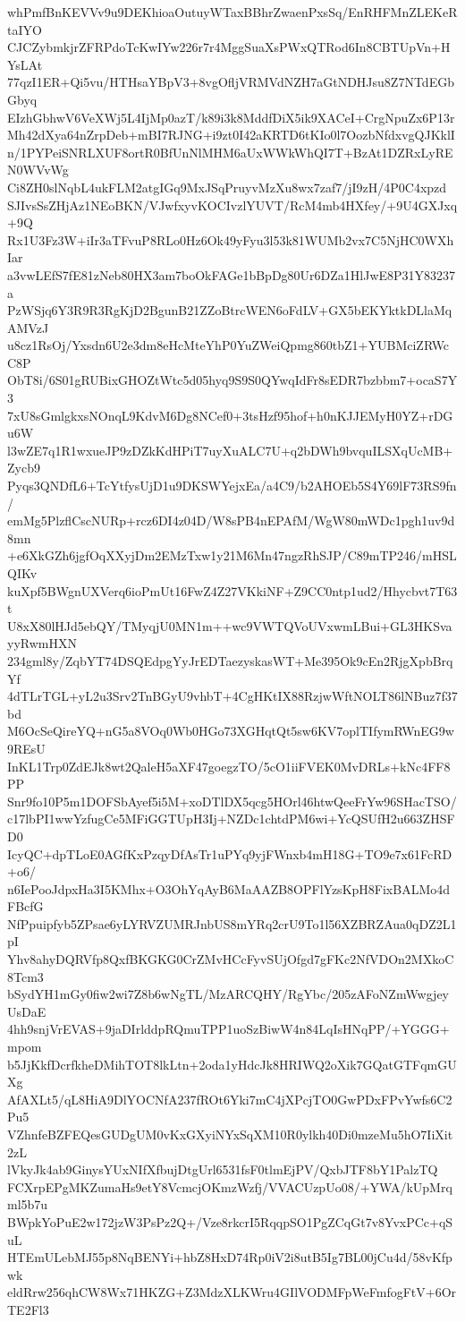 whPmfBnKEVVv9u9DEKhioaOutuyWTaxBBhrZwaenPxsSq/EnRHFMnZLEKeRtaIYO
CJCZybmkjrZFRPdoTcKwIYw226r7r4MggSuaXsPWxQTRod6In8CBTUpVn+HYsLAt
77qzI1ER+Qi5vu/HTHsaYBpV3+8vgOfljVRMVdNZH7aGtNDHJsu8Z7NTdEGbGbyq
EIzhGbhwV6VeXWj5L4IjMp0azT/k89i3k8MddfDiX5ik9XACeI+CrgNpuZx6P13r
Mh42dXya64nZrpDeb+mBI7RJNG+i9zt0I42aKRTD6tKIo0l7OozbNfdxvgQJKklI
n/1PYPeiSNRLXUF8ortR0BfUnNlMHM6aUxWWkWhQI7T+BzAt1DZRxLyREN0WVvWg
Ci8ZH0slNqbL4ukFLM2atgIGq9MxJSqPruyvMzXu8wx7zaf7/jI9zH/4P0C4xpzd
SJIvsSsZHjAz1NEoBKN/VJwfxyvKOCIvzlYUVT/RcM4mb4HXfey/+9U4GXJxq+9Q
Rx1U3Fz3W+iIr3aTFvuP8RLo0Hz6Ok49yFyu3l53k81WUMb2vx7C5NjHC0WXhIar
a3vwLEfS7fE81zNeb80HX3am7boOkFAGe1bBpDg80Ur6DZa1HlJwE8P31Y83237a
PzWSjq6Y3R9R3RgKjD2BgunB21ZZoBtrcWEN6oFdLV+GX5bEKYktkDLlaMqAMVzJ
u8cz1RsOj/Yxsdn6U2e3dm8eHcMteYhP0YuZWeiQpmg860tbZ1+YUBMciZRWcC8P
ObT8i/6S01gRUBixGHOZtWtc5d05hyq9S9S0QYwqIdFr8sEDR7bzbbm7+ocaS7Y3
7xU8sGmlgkxsNOnqL9KdvM6Dg8NCef0+3tsHzf95hof+h0nKJJEMyH0YZ+rDGu6W
l3wZE7q1R1wxueJP9zDZkKdHPiT7uyXuALC7U+q2bDWh9bvquILSXqUcMB+Zycb9
Pyqs3QNDfL6+TcYtfysUjD1u9DKSWYejxEa/a4C9/b2AHOEb5S4Y69lF73RS9fn/
emMg5PlzflCscNURp+rcz6DI4z04D/W8sPB4nEPAfM/WgW80mWDc1pgh1uv9d8mn
+e6XkGZh6jgfOqXXyjDm2EMzTxw1y21M6Mn47ngzRhSJP/C89mTP246/mHSLQIKv
kuXpf5BWgnUXVerq6ioPmUt16FwZ4Z27VKkiNF+Z9CC0ntp1ud2/Hhycbvt7T63t
U8xX80lHJd5ebQY/TMyqjU0MN1m++wc9VWTQVoUVxwmLBui+GL3HKSvayyRwmHXN
234gml8y/ZqbYT74DSQEdpgYyJrEDTaezyskasWT+Me395Ok9cEn2RjgXpbBrqYf
4dTLrTGL+yL2u3Srv2TnBGyU9vhbT+4CgHKtIX88RzjwWftNOLT86lNBuz7f37bd
M6OcSeQireYQ+nG5a8VOq0Wb0HGo73XGHqtQt5sw6KV7oplTIfymRWnEG9w9REsU
InKL1Trp0ZdEJk8wt2QaleH5aXF47goegzTO/5cO1iiFVEK0MvDRLs+kNc4FF8PP
Snr9fo10P5m1DOFSbAyef5i5M+xoDTlDX5qcg5HOrl46htwQeeFrYw96SHacTSO/
c17lbPI1wwYzfugCe5MFiGGTUpH3Ij+NZDc1chtdPM6wi+YcQSUfH2u663ZHSFD0
IcyQC+dpTLoE0AGfKxPzqyDfAsTr1uPYq9yjFWnxb4mH18G+TO9e7x61FcRD+o6/
n6IePooJdpxHa3I5KMhx+O3OhYqAyB6MaAAZB8OPFlYzsKpH8FixBALMo4dFBcfG
NfPpuipfyb5ZPsae6yLYRVZUMRJnbUS8mYRq2crU9To1l56XZBRZAua0qDZ2L1pI
Yhv8ahyDQRVfp8QxfBKGKG0CrZMvHCcFyvSUjOfgd7gFKc2NfVDOn2MXkoC8Tcm3
bSydYH1mGy0fiw2wi7Z8b6wNgTL/MzARCQHY/RgYbc/205zAFoNZmWwgjeyUsDaE
4hh9snjVrEVAS+9jaDIrlddpRQmuTPP1uoSzBiwW4n84LqIsHNqPP/+YGGG+mpom
b5JjKkfDcrfkheDMihTOT8lkLtn+2oda1yHdcJk8HRIWQ2oXik7GQatGTFqmGUXg
AfAXLt5/qL8HiA9DlYOCNfA237fROt6Yki7mC4jXPcjTO0GwPDxFPvYwfs6C2Pu5
VZhnfeBZFEQesGUDgUM0vKxGXyiNYxSqXM10R0ylkh40Di0mzeMu5hO7IiXit2zL
lVkyJk4ab9GinysYUxNIfXfbujDtgUrl6531fsF0tlmEjPV/QxbJTF8bY1PalzTQ
FCXrpEPgMKZumaHs9etY8VcmcjOKmzWzfj/VVACUzpUo08/+YWA/kUpMrqml5b7u
BWpkYoPuE2w172jzW3PsPz2Q+/Vze8rkcrI5RqqpSO1PgZCqGt7v8YvxPCc+qSuL
HTEmULebMJ55p8NqBENYi+hbZ8HxD74Rp0iV2i8utB5Ig7BL00jCu4d/58vKfpwk
eldRrw256qhCW8Wx71HKZG+Z3MdzXLKWru4GIlVODMFpWeFmfogFtV+6OrTE2Fl3
